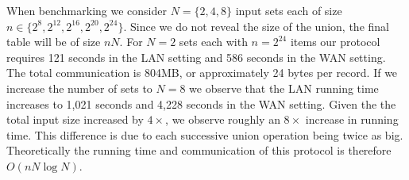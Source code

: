 When benchmarking we consider $N=\{2,4,8\}$ input sets each of size $n\in \{2^8, 2^{12}, 2^{16}, 2^{20}, 2^{24}\}$. Since we do not reveal the size of the union, the final table will be of size $nN$. For $N=2$ sets each with $n=2^{24}$ items our protocol requires 121 seconds in the LAN setting and 586 seconds in the WAN setting. The total communication is 804MB, or approximately 24 bytes per record. If we increase the number of sets to $N=8$ we observe that the LAN running time increases to 1,021 seconds and 4,228 seconds  in the WAN setting. Given the the total input size increased by $4\times$, we observe roughly an $8\times$ increase in running time. This difference is due to each successive union operation being twice as big. Theoretically the running time and communication of this protocol is therefore $O(nN\log N)$.

